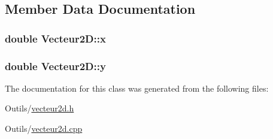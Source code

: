 \subsection{Member Data Documentation}
\hypertarget{class_vecteur2_d_a3a18b26b7d21dd930e3b0d22ba8ae4ee}{
\subsubsection[{x}]{\setlength{\rightskip}{0pt plus 5cm}double Vecteur2\+D\+::x}}\label{class_vecteur2_d_a3a18b26b7d21dd930e3b0d22ba8ae4ee}
\hypertarget{class_vecteur2_d_a3c8beeb57ed70e29fb603b46798a5d9e}{
\subsubsection[{y}]{\setlength{\rightskip}{0pt plus 5cm}double Vecteur2\+D\+::y}}\label{class_vecteur2_d_a3c8beeb57ed70e29fb603b46798a5d9e}


The documentation for this class was generated from the following files\+:\begin{DoxyCompactItemize}
\item 
Outils/\hyperlink{vecteur2d_8h}{vecteur2d.\+h}\item 
Outils/\hyperlink{vecteur2d_8cpp}{vecteur2d.\+cpp}\end{DoxyCompactItemize}
